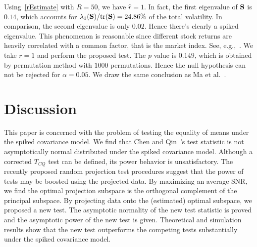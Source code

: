 \documentclass[times,sort&compress,3p]{elsarticle}
\newcommand{\mytr}{\rm tr}
\theoremstyle{plain}
\theoremstyle{definition}
\theoremstyle{remark}
\begin{document}
Using~\eqref{rEstimate} with $R=50$, we have $\hat{r}=1$.
In fact, the first eigenvalue of $\mathbf{S}$ is $0.14$, which accounts for $\lambda_1(\BS)/\mytr(\BS)=24.86\%$ of the total volatility.
In comparison, the second eigenvalue is only $0.02$.
Hence there's clearly a spiked eigenvalue.
This phenomenon is reasonable since different stock returns are heavily correlated with a common factor, that is the market index. See, e.g.,~\cite{Ma2015A}.
We take $r=1$ and perform the proposed test.
The $p$ value is $0.149$, which is obtained by permutation method with $1000$ permutations.
Hence the null hypothesis can not be rejected for $\alpha=0.05$.
We draw the same conclusion as Ma {\rm et al.}~\cite{Ma2015A}.



\section{Discussion}



This paper is concerned with the problem of testing the equality of means under the spiked covariance model.
We find that Chen and Qin~\cite{Chen2010A}'s test statistic is not asymptotically normal distributed under the spiked covariance model. 
Although a corrected $T_{CQ}$ test can be defined, its power behavior is unsatisfactory.
The recently proposed random projection test procedures suggest that the power of tests may be boosted using the projected data.
By maximizing an average SNR, we find the optimal projection subspace is the orthogonal complement of the principal subspace.
By projecting data onto the (estimated) optimal subspace, we proposed a new test.
The asymptotic normality of the new test statistic is proved and the asymptotic power of the new test is given.
    Theoretical and simulation results show that the new test outperforms the competing tests substantially under the spiked covariance model.
\end{document}
